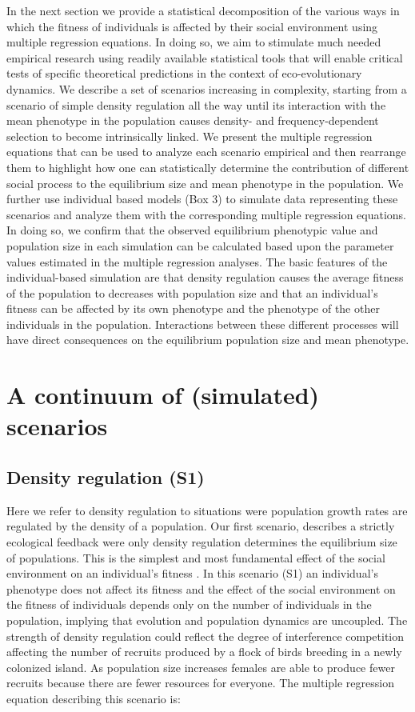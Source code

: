 \documentclass{article}
\begin{document}
In the next section we provide a statistical decomposition of the various ways in which the fitness of individuals is affected by their social environment using multiple regression equations. In doing so, we aim to stimulate much needed empirical research using readily available statistical tools that will enable critical tests of specific theoretical predictions in the context of eco-evolutionary dynamics. We describe a set of scenarios increasing in complexity, starting from a scenario of simple density regulation all the way until its interaction with the mean phenotype in the population causes density- and frequency-dependent selection to become intrinsically linked. We present the multiple regression equations that can be used to analyze each scenario empirical and then rearrange them to highlight how one can statistically determine the contribution of different social process to the equilibrium size and mean phenotype in the population. We further use individual based models (Box 3) to simulate data representing these scenarios and analyze them with the corresponding multiple regression equations. In doing so, we confirm that the observed equilibrium phenotypic value and population size in each simulation can be calculated based upon the parameter values estimated in the multiple regression analyses. The basic features of the individual-based simulation are that density regulation causes the average fitness of the population to decreases with population size and that an individual's fitness can be affected by its own phenotype and the phenotype of the other individuals in the population. Interactions between these different processes will have direct consequences on the equilibrium population size and mean phenotype. 


\section{A continuum of (simulated) scenarios}
\subsection{Density regulation (S1)}
Here we refer to density regulation to situations were population growth rates are regulated by the density of a population. Our first scenario, describes a strictly ecological feedback were only density regulation determines the equilibrium size of populations. This is the simplest and most fundamental effect of the social environment on an individual's fitness \citep{Brook2006}. In this scenario (S1) an individual's phenotype does not affect its fitness and the effect of the social environment on the fitness of individuals depends only on the number of individuals in the population, implying that evolution and population dynamics are uncoupled. The strength of density regulation could reflect the degree of interference competition affecting the number of recruits produced by a flock of birds breeding in a newly colonized island. As population size increases females are able to produce fewer recruits because there are fewer resources for everyone. The multiple regression equation describing this scenario is:
\end{document}
